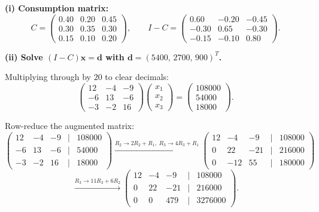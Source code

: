 \documentclass[12pt,a3paper]{article}
\begin{document}
\begin{tcolorbox}[enhanced,breakable,
  colback=cA!4,colframe=cA,boxrule=0.8pt,arc=5pt,
  title={\textbf{Answer --- Leontief Open Economy: Production Vector}},
  fonttitle=\bfseries\color{white},colbacktitle=cA]

\textbf{(i) Consumption matrix:}
\[
  C = \begin{pmatrix}0.40&0.20&0.45\\0.30&0.35&0.30\\0.15&0.10&0.20\end{pmatrix}, \qquad
  I-C = \begin{pmatrix}0.60&-0.20&-0.45\\-0.30&0.65&-0.30\\-0.15&-0.10&0.80\end{pmatrix}.
\]

\textbf{(ii) Solve $(I-C)\mathbf{x}=\mathbf{d}$ with $\mathbf{d}=(5400,\,2700,\,900)^T$.}

Multiplying through by $20$ to clear decimals:
\[
  \begin{pmatrix}12&-4&-9\\-6&13&-6\\-3&-2&16\end{pmatrix}
  \begin{pmatrix}x_1\\x_2\\x_3\end{pmatrix}
  =\begin{pmatrix}108000\\54000\\18000\end{pmatrix}.
\]

Row-reduce the augmented matrix:
\[
  \begin{pmatrix}12&-4&-9&|&108000\\-6&13&-6&|&54000\\-3&-2&16&|&18000\end{pmatrix}
  \xrightarrow{R_2\to 2R_2+R_1,\;R_3\to 4R_3+R_1}
  \begin{pmatrix}12&-4&-9&|&108000\\0&22&-21&|&216000\\0&-12&55&|&180000\end{pmatrix}
\]
\[
  \xrightarrow{R_3\to 11R_3+6R_2}
  \begin{pmatrix}12&-4&-9&|&108000\\0&22&-21&|&216000\\0&0&479&|&3276000\end{pmatrix}.
\]


\end{tcolorbox}
\end{document}
